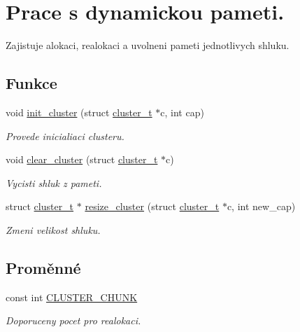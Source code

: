 \hypertarget{group__DynamickaPamet}{}\section{Prace s dynamickou pameti.}
\label{group__DynamickaPamet}


Zajistuje alokaci, realokaci a uvolneni pameti jednotlivych shluku.  


\subsection*{Funkce}
\begin{DoxyCompactItemize}
\item 
void \hyperlink{group__DynamickaPamet_ga96db0862471d90abb3d80103ef3695f7}{init\+\_\+cluster} (struct \hyperlink{structcluster__t}{cluster\+\_\+t} $\ast$c, int cap)
\begin{DoxyCompactList}\small\item\em Provede inicialiaci clusteru. \end{DoxyCompactList}\item 
void \hyperlink{group__DynamickaPamet_ga8289f092f205baeb13cf33cfffa15324}{clear\+\_\+cluster} (struct \hyperlink{structcluster__t}{cluster\+\_\+t} $\ast$c)
\begin{DoxyCompactList}\small\item\em Vycisti shluk z pameti. \end{DoxyCompactList}\item 
struct \hyperlink{structcluster__t}{cluster\+\_\+t} $\ast$ \hyperlink{group__DynamickaPamet_ga0d8702f8bee3bccb81380e012a615a3d}{resize\+\_\+cluster} (struct \hyperlink{structcluster__t}{cluster\+\_\+t} $\ast$c, int new\+\_\+cap)
\begin{DoxyCompactList}\small\item\em Zmeni velikost shluku. \end{DoxyCompactList}\end{DoxyCompactItemize}
\subsection*{Proměnné}
\begin{DoxyCompactItemize}
\item 
const int \hyperlink{group__DynamickaPamet_gafb09f2bf4615f5ac7a91807aa086d4c3}{C\+L\+U\+S\+T\+E\+R\+\_\+\+C\+H\+U\+NK}
\begin{DoxyCompactList}\small\item\em Doporuceny pocet pro realokaci. \end{DoxyCompactList}\end{DoxyCompactItemize}


